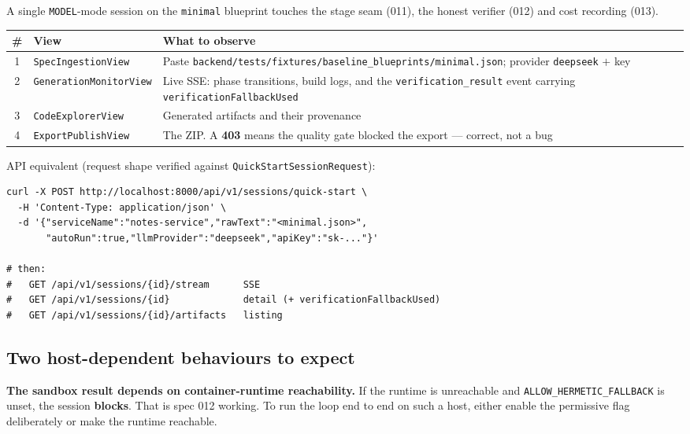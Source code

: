 \documentclass[11pt,a4paper]{article}
\begin{document}
A single \texttt{MODEL}-mode session on the \texttt{minimal} blueprint touches the
stage seam (011), the honest verifier (012) and cost recording (013).

\begin{center}
\begin{tabular}{@{}clp{}@{}}
\toprule
\textbf{\#} & \textbf{View} & \textbf{What to observe} \\
\midrule
1 & \texttt{SpecIngestionView} & Paste
\texttt{backend/tests/fixtures/baseline\_blueprints/minimal.json}; provider
\texttt{deepseek} $+$ key \\
2 & \texttt{GenerationMonitorView} & Live SSE: phase transitions, build logs, and
the \texttt{verification\_result} event carrying \texttt{verificationFallbackUsed} \\
3 & \texttt{CodeExplorerView} & Generated artifacts and their provenance \\
4 & \texttt{ExportPublishView} & The ZIP. A \textbf{403} means the quality gate
blocked the export --- correct, not a bug \\
\bottomrule
\end{tabular}
\end{center}

API equivalent (request shape verified against
\texttt{QuickStartSessionRequest}):

\begin{lstlisting}
curl -X POST http://localhost:8000/api/v1/sessions/quick-start \
  -H 'Content-Type: application/json' \
  -d '{"serviceName":"notes-service","rawText":"<minimal.json>",
       "autoRun":true,"llmProvider":"deepseek","apiKey":"sk-..."}'

# then:
#   GET /api/v1/sessions/{id}/stream      SSE
#   GET /api/v1/sessions/{id}             detail (+ verificationFallbackUsed)
#   GET /api/v1/sessions/{id}/artifacts   listing
\end{lstlisting}

\subsection{Two host-dependent behaviours to expect}

\textbf{The sandbox result depends on container-runtime reachability.} If the
runtime is unreachable and \texttt{ALLOW\_HERMETIC\_FALLBACK} is unset, the session
\textbf{blocks}. That is spec 012 working. To run the loop end to end on such a host,
either enable the permissive flag deliberately or make the runtime reachable.
\end{document}
